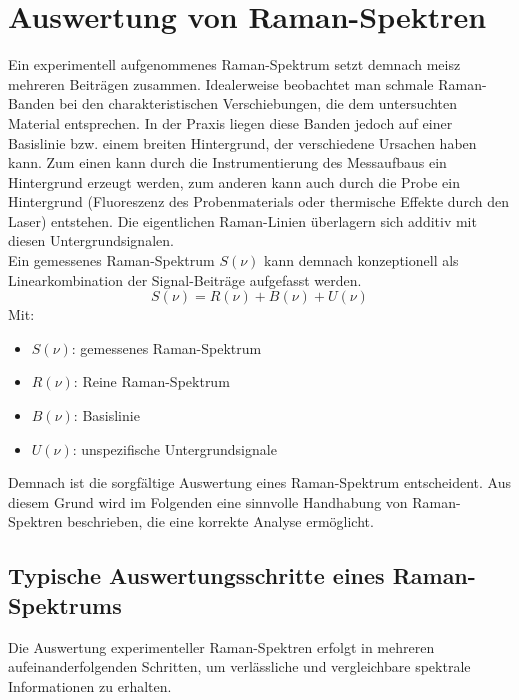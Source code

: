\section{Auswertung von Raman-Spektren}\label{sec:analysis}
Ein experimentell aufgenommenes Raman-Spektrum setzt demnach meisz mehreren Beiträgen zusammen. Idealerweise beobachtet man schmale Raman-Banden bei den charakteristischen Verschiebungen, die 
dem untersuchten Material entsprechen. In der Praxis liegen diese Banden jedoch auf einer Basislinie bzw. einem breiten Hintergrund, der verschiedene Ursachen haben kann. Zum einen 
kann durch die Instrumentierung des Messaufbaus ein Hintergrund erzeugt werden, zum anderen kann auch durch die Probe ein Hintergrund (Fluoreszenz des Probenmaterials oder thermische Effekte durch den Laser) entstehen.
Die eigentlichen Raman-Linien überlagern sich additiv mit diesen Untergrundsignalen.\\
\clearpage
Ein gemessenes Raman-Spektrum $S(\nu)$ kann demnach konzeptionell als Linearkombination der Signal-Beiträge aufgefasst werden.
\begin{equation}
    S(\nu) = R(\nu) + B(\nu) + U(\nu)
\end{equation}
Mit:
\begin{itemize}
    \item $S(\nu)$: gemessenes Raman-Spektrum 
    \item $R(\nu)$: Reine Raman-Spektrum 
    \item $B(\nu)$: Basislinie 
    \item $U(\nu)$: unspezifische Untergrundsignale 
\end{itemize}
Demnach ist die sorgfältige Auswertung eines Raman-Spektrum entscheident.
Aus diesem Grund wird im Folgenden eine sinnvolle Handhabung von Raman-Spektren beschrieben, die eine korrekte Analyse ermöglicht.

\subsection{Typische Auswertungsschritte eines Raman-Spektrums}

Die Auswertung experimenteller Raman-Spektren erfolgt in mehreren aufeinanderfolgenden Schritten, um verlässliche und vergleichbare spektrale Informationen zu erhalten.

